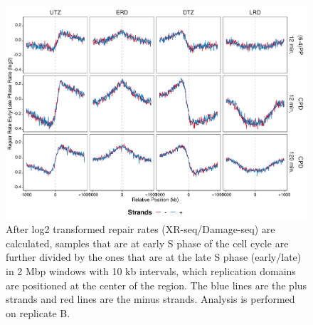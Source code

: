 \begin{figure}[H]
\begin{center}
\includegraphics[width=\textwidth]{Chapters/7_appendix/figures/supfig29}
\caption[Repair rate early/late phase ratio of replication domains in 2 Mbp (replicate B).]{After log2 transformed repair rates (XR-seq/Damage-seq) are calculated, samples that are at early S phase of the cell cycle are further divided by the ones that are at the late S phase (early/late) in 2 Mbp windows with 10 kb intervals, which replication domains are positioned at the center of the region. The blue lines are the plus strands and red lines are the minus strands. Analysis is performed on replicate B.}
\label{supfig:rrel2000repdomainB}
\end{center}
\end{figure}

